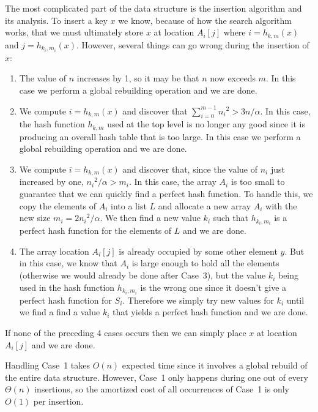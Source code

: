 The most complicated part of the data structure is the insertion
algorithm and its analysis.  To insert a key $x$ we know, because of
how the search algorithm works, that we must ultimately store $x$ at
location $A_i[j]$ where $i=h_{k,m}(x)$ and $j=h_{k_i,m_i}(x)$.
However, several things can go wrong during the insertion of $x$:

\begin{enumerate} 
\item The value of $n$ increases by 1, so it may be that $n$ now
exceeds $m$.  In this case we perform a global rebuilding
operation and we are done.

\item We compute $i=h_{k,m}(x)$ and discover that $\sum_{i=0}^{m-1}
n_i{}^2 > 3n/\alpha$.  In this case, the hash function
$h_{k,m}$ used at the top level is no longer any good since it is
producing an overall hash table that is too large.  In this case we
perform a global rebuilding operation and we are done.

\item We compute $i=h_{k,m}(x)$ and discover that, since the value of
$n_i$ just increased by one, $n_i{}^2/\alpha > m_i$. In this case, the
array $A_i$ is too small to guarantee that we can quickly find a
perfect hash function.  To handle this, we copy the elements of $A_i$
into a list $L$ and allocate a new array $A_i$ with the new size
$m_i=2n_i{}^2/\alpha$.  We then find a new value $k_i$ such that
$h_{k_i,m_i}$ is a perfect hash function for the elements of $L$ and
we are done.

\item The array location $A_i[j]$ is already occupied by some other
element $y$.  But in this case, we know that $A_i$ is large enough to
hold all the elements (otherwise we would already be done after
Case~3), but the value $k_i$ being used in the hash function
$h_{k_i,m_i}$ is the wrong one since it doesn't give a perfect hash
function for $S_i$.  Therefore we simply try new values for $k_i$
until we find a find a value $k_i$ that yields a perfect hash function
and we are done.  
\end{enumerate}

If none of the preceding 4 cases occurs then we can simply place $x$
at location $A_i[j]$ and we are done.

Handling Case~1 takes $O(n)$ expected time since it involves a global
rebuild of the entire data structure.  However, Case~1 only happens
during one out of every $\Theta(n)$ insertions, so the amortized cost
of all occurrences of Case~1 is only $O(1)$ per insertion.

